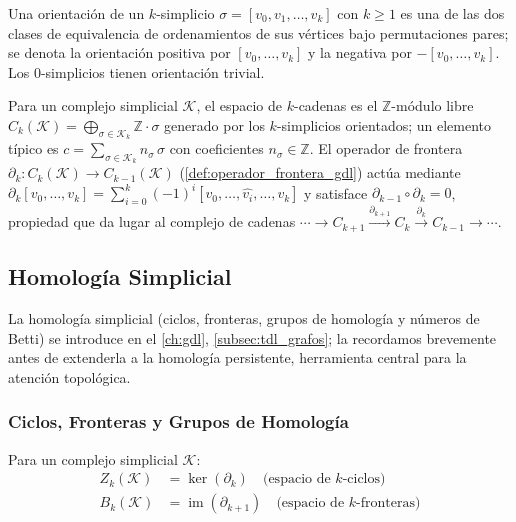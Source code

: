 \begin{definition}\label{def:orientacion_simplicio}
Una orientación de un $k$-simplicio $\sigma = [v_0, v_1, \ldots, v_k]$ con $k \geq 1$ es una de las dos clases de equivalencia de ordenamientos de sus vértices bajo permutaciones pares; se denota la orientación positiva por $[v_0, \ldots, v_k]$ y la negativa por $-[v_0, \ldots, v_k]$. Los 0-simplicios tienen orientación trivial.
\end{definition}

\begin{definition}\label{def:espacio_cadenas}
Para un complejo simplicial $\mathcal{K}$, el espacio de $k$-cadenas es el $\mathbb{Z}$-módulo libre $C_k(\mathcal{K}) = \bigoplus_{\sigma \in \mathcal{K}_k} \mathbb{Z} \cdot \sigma$ generado por los $k$-simplicios orientados; un elemento típico es $c = \sum_{\sigma \in \mathcal{K}_k} n_{\sigma}\, \sigma$ con coeficientes $n_{\sigma} \in \mathbb{Z}$. El operador de frontera $\partial_k: C_k(\mathcal{K}) \to C_{k-1}(\mathcal{K})$ (\autoref{def:operador_frontera_gdl}) actúa mediante $\partial_k[v_0, \ldots, v_k] = \sum_{i=0}^k (-1)^i [v_0, \ldots, \hat{v_i}, \ldots, v_k]$ y satisface $\partial_{k-1} \circ \partial_k = 0$, propiedad que da lugar al complejo de cadenas $\cdots \to C_{k+1} \xrightarrow{\partial_{k+1}} C_k \xrightarrow{\partial_k} C_{k-1} \to \cdots$.
\end{definition}

\subsection{Homología Simplicial}

La homología simplicial (ciclos, fronteras, grupos de homología y números de Betti) se introduce en el \autoref{ch:gdl}, \autoref{subsec:tdl_grafos}; la recordamos brevemente antes de extenderla a la homología persistente, herramienta central para la atención topológica.

\subsubsection{Ciclos, Fronteras y Grupos de Homología}

\begin{definition}\label{def:ciclos_fronteras}
Para un complejo simplicial $\mathcal{K}$:
\begin{align}
    Z_k(\mathcal{K}) &= \ker(\partial_k) \quad \text{(espacio de } k\text{-ciclos)} \\
    B_k(\mathcal{K}) &= \operatorname{im}(\partial_{k+1}) \quad \text{(espacio de } k\text{-fronteras)}
\end{align}
\end{definition}

